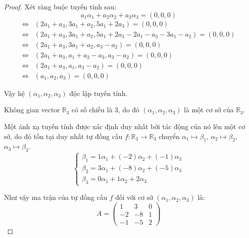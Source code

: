\begin{proof}
    Xét ràng buộc tuyến tính sau:
    \[
        a_{1}\alpha_{1} + a_{2}\alpha_{2} + a_{3}\alpha_{3} = (0,0,0)
    \]
    \begin{align*}
        \Longleftrightarrow & (2a_{1} + a_{3}, 3a_{1} + a_{2}, 5a_{1} + 2a_{3}) = (0,0,0)                                   \\
        \Longleftrightarrow & (2a_{1} + a_{3}, 3a_{1} + a_{2}, 5a_{1} + 2a_{3} - 2a_{1} - a_{3} - 3a_{1} - a_{2}) = (0,0,0) \\
        \Longleftrightarrow & (2a_{1} + a_{3}, 3a_{1} + a_{2}, a_{3} - a_{2}) = (0,0,0)                                     \\
        \Longleftrightarrow & (2a_{1} + a_{3}, a_{1} + a_{2} - a_{3}, a_{3} - a_{2}) = (0,0,0)                              \\
        \Longleftrightarrow & (2a_{1} + a_{3}, a_{1}, a_{3} - a_{2}) = (0,0,0)                                              \\
        \Longleftrightarrow & (a_{1}, a_{2}, a_{3}) = (0,0,0)
    \end{align*}
    
    Vậy hệ $(\alpha_{1}, \alpha_{2}, \alpha_{3})$ độc lập tuyến tính.
    
    Không gian vector $\mathbb{R}_{3}$ có số chiều là 3, do đó $(\alpha_{1}, \alpha_{2}, \alpha_{3})$ là một cơ sở của $\mathbb{R}_{3}$.
    
    Một ánh xạ tuyến tính được xác định duy nhất bởi tác động của nó lên một cơ sở, do đó tồn tại duy nhất tự đồng cấu $f: \mathbb{R}_{3}\to\mathbb{R}_{3}$ chuyển $\alpha_{1}\mapsto\beta_{1}$, $\alpha_{2}\mapsto\beta_{2}$, $\alpha_{3}\mapsto\beta_{3}$.
    \[
        \begin{cases}
            \beta_{1} = 1\alpha_{1} + (-2)\alpha_{2} + (-1)\alpha_{3} \\
            \beta_{2} = 3\alpha_{1} + (-8)\alpha_{2} + (-5)\alpha_{3} \\
            \beta_{3} = 0\alpha_{1} + 1\alpha_{2} + 2\alpha_{3}
        \end{cases}
    \]
    
    Như vậy ma trận của tự đồng cấu $f$ đối với cơ sở $(\alpha_{1}, \alpha_{2}, \alpha_{3})$ là:
    \[
        A =
        \begin{pmatrix}
            1  & 3  & 0 \\
            -2 & -8 & 1 \\
            -1 & -5 & 2
        \end{pmatrix}
    \]
    

\end{proof}
